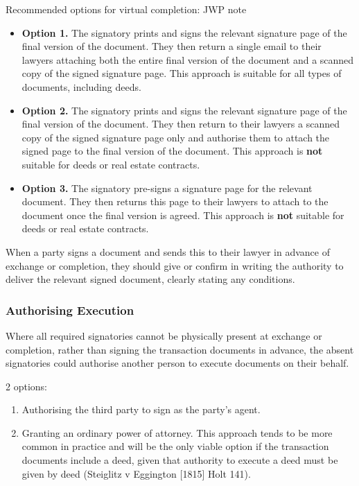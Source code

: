 \documentclass[
]{article}
\providecommand{\tightlist}{%
  \setlength{\itemsep}{0pt}\setlength{\parskip}{0pt}}
\newenvironment{env-a57f3fff-c46d-4aeb-b36c-ada0d8066098}
{
    \savenotes\tcolorbox[blanker,breakable,left=5pt,borderline west={2pt}{-4pt}{aquamarine}]
}
{
    \endtcolorbox\spewnotes
}
\begin{document}
\begin{env-a57f3fff-c46d-4aeb-b36c-ada0d8066098}

Recommended options for virtual completion: JWP note

\begin{itemize}
\item
  \textbf{Option 1.} The signatory prints and signs the relevant
  signature page of the final version of the document. They then return
  a single email to their lawyers attaching both the entire final
  version of the document and a scanned copy of the signed signature
  page. This approach is suitable for all types of documents, including
  deeds.
\item
  \textbf{Option 2.} The signatory prints and signs the relevant
  signature page of the final version of the document. They then return
  to their lawyers a scanned copy of the signed signature page only and
  authorise them to attach the signed page to the final version of the
  document. This approach is \textbf{not} suitable for deeds or real
  estate contracts.
\item
  \textbf{Option 3.} The signatory pre-signs a signature page for the
  relevant document. They then returns this page to their lawyers to
  attach to the document once the final version is agreed. This approach
  is \textbf{not} suitable for deeds or real estate contracts.
\end{itemize}

\end{env-a57f3fff-c46d-4aeb-b36c-ada0d8066098}

When a party signs a document and sends this to their lawyer in advance
of exchange or completion, they should give or confirm in writing the
authority to deliver the relevant signed document, clearly stating any
conditions.

\hypertarget{authorising-execution}{%
\subsubsection{Authorising Execution}\label{authorising-execution}}

Where all required signatories cannot be physically present at exchange
or completion, rather than signing the transaction documents in advance,
the absent signatories could authorise another person to execute
documents on their behalf.

2 options:

\begin{enumerate}
\tightlist
\item
  Authorising the third party to sign as the party's agent.
\item
  Granting an ordinary power of attorney. This approach tends to be more
  common in practice and will be the only viable option if the
  transaction documents include a deed, given that authority to execute
  a deed must be given by deed (Steiglitz v Eggington {[}1815{]} Holt
  141).
\end{enumerate}
\end{document}
